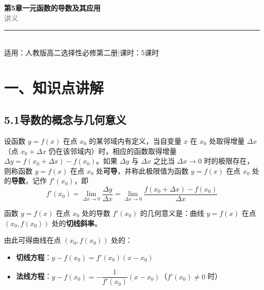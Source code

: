 \documentclass[12pt, a4paper]{ctexart}
\begin{document}
\begin{center}
{\Huge\bfseries\textcolor{mainblue}{第5章\quad 一元函数的导数及其应用}}\\[12pt]
{\Large\textcolor{gray}{讲\quad 义}}\\[8pt]
\rule{0.6\textwidth}{1pt}\\[8pt]
{\normalsize 适用：人教版\quad 高二选择性必修第二册\quad |\quad 课时：5课时}
\end{center}
\vspace{10pt}

\section*{\textcolor{mainblue}{一、知识点讲解}}

\subsection*{5.1\quad 导数的概念与几何意义}

\begin{knowledgebox}[导数的定义]
设函数 $y = f(x)$ 在点 $x_0$ 的某邻域内有定义，当自变量 $x$ 在 $x_0$ 处取得增量 $\Delta x$（点 $x_0 + \Delta x$ 仍在该邻域内）时，相应的函数取得增量 $\Delta y = f(x_0 + \Delta x) - f(x_0)$。如果 $\Delta y$ 与 $\Delta x$ 之比当 $\Delta x \to 0$ 时的极限存在，则称函数 $y = f(x)$ 在点 $x_0$ 处\textbf{可导}，并称此极限值为函数 $y = f(x)$ 在点 $x_0$ 处的\textbf{导数}，记作 $f'(x_0)$，即
\[
f'(x_0) = \lim_{\Delta x \to 0} \frac{\Delta y}{\Delta x} = \lim_{\Delta x \to 0} \frac{f(x_0 + \Delta x) - f(x_0)}{\Delta x}
\]
\end{knowledgebox}

\begin{knowledgebox}[导数的几何意义]
函数 $y = f(x)$ 在点 $x_0$ 处的导数 $f'(x_0)$ 的几何意义是：曲线 $y = f(x)$ 在点 $(x_0, f(x_0))$ 处的\textbf{切线斜率}。

由此可得曲线在点 $(x_0, f(x_0))$ 处的：
\begin{itemize}[leftmargin=2em]
  \item \textbf{切线方程}：$y - f(x_0) = f'(x_0)(x - x_0)$
  \item \textbf{法线方程}：$y - f(x_0) = -\dfrac{1}{f'(x_0)}(x - x_0)$\quad（$f'(x_0) \neq 0$ 时）
\end{itemize}
\end{knowledgebox}
\end{document}

